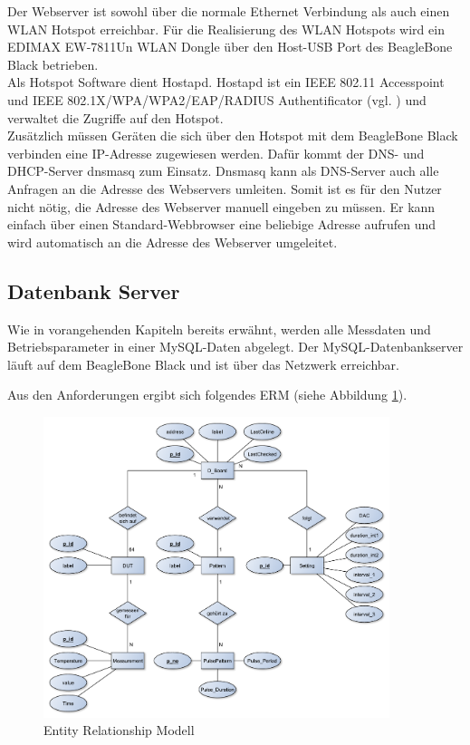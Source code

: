 Der Webserver ist sowohl über die normale Ethernet Verbindung als auch einen WLAN Hotspot erreichbar. Für die Realisierung des WLAN Hotspots wird ein EDIMAX EW-7811Un WLAN Dongle über den Host-USB Port des BeagleBone Black betrieben.\\
Als Hotspot Software dient Hostapd. Hostapd ist ein IEEE 802.11 Accesspoint und IEEE 802.1X/WPA/WPA2/EAP/RADIUS Authentificator (vgl. \cite{LinuxWireless}) und verwaltet die Zugriffe auf den Hotspot.\\
Zusätzlich müssen Geräten die sich über den Hotspot mit dem BeagleBone Black verbinden eine IP-Adresse zugewiesen werden. Dafür kommt der DNS- und DHCP-Server dnsmasq zum Einsatz. Dnsmasq kann als DNS-Server auch alle Anfragen an die Adresse des Webservers umleiten. Somit ist es für den Nutzer nicht nötig, die Adresse des Webserver manuell eingeben zu müssen. Er kann einfach über einen Standard-Webbrowser eine beliebige Adresse aufrufen und wird automatisch an die Adresse des Webserver umgeleitet.\\




\newpage
 
\subsection{Datenbank Server}
\label{section_EntwurfDatenbank}

Wie in vorangehenden Kapiteln bereits erwähnt, werden alle Messdaten und Betriebsparameter in einer MySQL-Daten abgelegt. Der MySQL-Datenbankserver läuft auf dem BeagleBone Black und ist über das Netzwerk erreichbar.

Aus den Anforderungen ergibt sich folgendes \ac{ERM} (siehe Abbildung \ref{ERM}). \\

\begin{figure}[H]
\begin{center}
\includegraphics[width=0.9\textwidth]{img/general/ER_Diagramm.pdf}
\caption{Entity Relationship Modell}
\label{ERM}
\end{center}
\end{figure}

